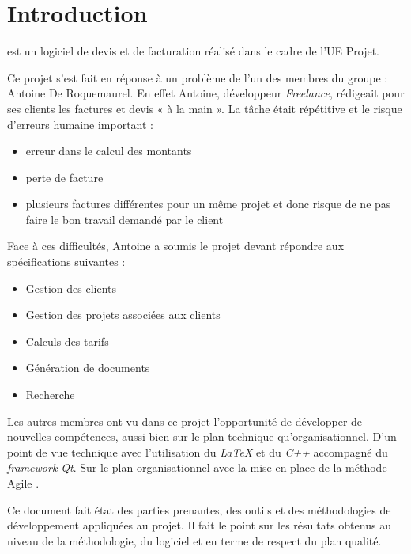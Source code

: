 \chapter*{Introduction}

\setlength{\parindent}{1cm}
\FactDev{}  est un logiciel de devis et de facturation réalisé dans le cadre de l’UE Projet. 

Ce projet s’est fait en réponse à un problème de l’un des membres du groupe : Antoine De Roquemaurel. En effet Antoine, développeur \textit{Freelance}, rédigeait pour ses clients les factures et devis « à la main ». La tâche était répétitive et le risque d’erreurs humaine important : 
\begin{itemize}
	\item erreur dans le calcul des montants
	\item perte de facture
	\item plusieurs factures différentes pour un même projet et donc risque de ne pas faire le bon travail demandé par le client
\end{itemize}

Face à ces difficultés, Antoine a soumis le projet devant répondre aux spécifications suivantes :
\begin{itemize}
	\item Gestion des clients
	\item Gestion des projets associées aux clients
	\item Calculs des tarifs
	\item Génération de documents
	\item Recherche
\end{itemize}


Les autres membres ont vu dans ce projet l'opportunité de développer de nouvelles compétences, aussi bien sur le plan technique qu'organisationnel. D'un point de vue technique avec l'utilisation du \textit{LaTeX} et du \textit{C++} accompagné du \textit{framework Qt}. Sur le plan organisationnel avec la mise en place de la méthode Agile \Scrum. 

Ce document fait état des parties prenantes, des outils et des méthodologies de développement appliquées au projet. Il fait le point sur les résultats obtenus au niveau de la méthodologie, du logiciel et en terme de respect du plan qualité. 